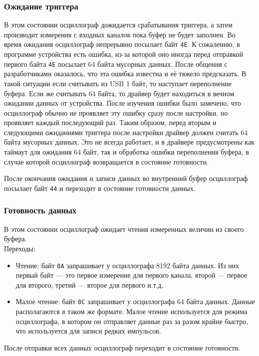 \documentclass[a4paper,12pt]{report}
\numberwithin{equation}{section}
\begin{document}
\subsubsection{Ожидание триггера} \label{ostate:trigger}
В этом состоянии осциллограф дожидается срабатывания триггера, а затем
производит измерения с входных каналов пока буфер не будет заполнен. Во время
ожидания осциллограф непрерывно посылает байт \texttt{4E}. К сожалению, в
программе устройства есть ошибка, из-за которой оно иногда перед отправкой
первого байта \texttt{4E} посылает 64 байта мусорных данных. После общения с
разработчиками оказалось, что эта ошибка известна и её тяжело предсказать. В
такой ситуации если считывать из USB 1 байт, то наступает переполнение
буфера. Если же считывать 64 байта, то драйвер будет находиться в вечном
ожидании данных от устройства. После изучения ошибки было замечено, что
осциллограф обычно не проявляет эту ошибку сразу после настройки, но проявляет
каждый последующий раз. Таким образом, перед вторым и следующими ожиданиями
триггера после настройки драйвер должен считать 64 байта мусорных данных. Это не
всегда работает, и в драйвере предусмотрены как таймаут для ожидания 64 байт,
так и обработка ошибки переполнения буфера, в случае которой осциллограф
возвращается в состояние готовности.

После окончания ожидания и записи данных во внутренний буфер осциллограф
посылает байт \texttt{44} и переходит в состояние готовности данных.

\subsubsection{Готовность данных} \label{ostate:data}
В этом состоянии осциллограф ожидает чтения измеренных величин из своего
буфера. \\
Переходы:
\begin{itemize}
\item Чтение: байт \texttt{0A} запрашивает у осциллографа 8192 байта данных. Из
  них первый байт --- это первое измерение для первого канала, второй --- первое
  для второго, третий --- второе для первого и.т.д.
\item Малое чтение: байт \texttt{0C} запрашивает у осциллографа 64 байта
  данных. Данные располагаются в таком же формате. Малое чтение используется для
  режима осциллографа, в котором он отправляет данные раз за разом крайне
  быстро, что используется для записи редких импульсов.
\end{itemize}
После отправки всех данных осциллограф переходит в состояние готовности.
\end{document}
